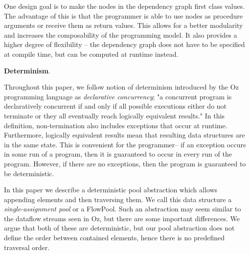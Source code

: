 \documentclass[runningheads,a4paper]{llncs}
\begin{document}
One design goal is to make the nodes in the dependency graph first
class values.
The advantage of this is that the programmer is able to use
nodes as procedure arguments or receive them as return values.
This allows for a better modularity and increases the
composability of the programming model.
It also provides a higher degree of flexibility -- the dependency
graph does not have to be specified at compile time, but can be
computed at runtime instead.

\textbf{Determinism}.

Throughout this paper, we follow notion of determinism introduced by the Oz
programming language \cite{RoyH2004} as \textit{declarative concurrency}; "a
concurrent program is declaratively concurrent if and only if all possible
executions either do not terminate or they all eventually reach logically
equivalent results." In this definition, non-termination also includes
exceptions that occur at runtime. Furthermore, logically equivalent results
mean that resulting data structures are in the same state. This is
convenient for the programmer-- if an exception occurs in some run of a
program, then it is guaranteed to occur in every run of the program. However,
if there are no exceptions, then the program is guaranteed to be
deterministic.


In this paper we describe a deterministic pool abstraction which allows
appending elements and then traversing them.
We call this data structure a \textit{single-assignment pool} or a FlowPool.
Such an abstraction may seem similar to the dataflow streams seen in Oz,
but there are some important differences.
We argue that both of these are deterministic, but our pool abstraction
does not define the order between contained elements, hence there is
no predefined traversal order.
\end{document}
